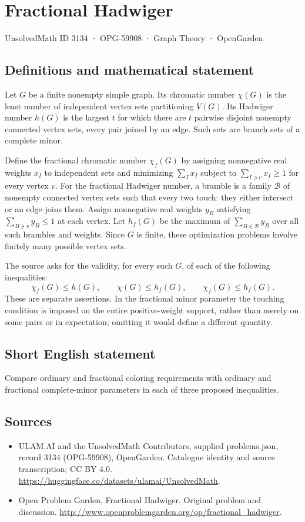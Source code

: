 \documentclass[11pt,a4paper]{article}
\begin{document}
\section*{Fractional Hadwiger}\label{3134}
{\small UnsolvedMath ID 3134 · OPG-59908 · Graph Theory · OpenGarden}
\subsection{Definitions and mathematical statement}
Let $G$ be a finite nonempty simple graph. Its chromatic number $\chi(G)$ is the least number of independent vertex sets partitioning $V(G)$. Its Hadwiger number $h(G)$ is the largest $t$ for which there are $t$ pairwise disjoint nonempty connected vertex sets, every pair joined by an edge. Such sets are branch sets of a complete minor.

Define the fractional chromatic number $\chi_f(G)$ by assigning nonnegative real weights $x_I$ to independent sets and minimizing $\sum_Ix_I$ subject to $\sum_{I\ni v}x_I\ge1$ for every vertex $v$. For the fractional Hadwiger number, a bramble is a family $\mathcal B$ of nonempty connected vertex sets such that every two touch: they either intersect or an edge joins them. Assign nonnegative real weights $y_B$ satisfying $\sum_{B\ni v}y_B\le1$ at each vertex. Let $h_f(G)$ be the maximum of $\sum_{B\in\mathcal B}y_B$ over all such brambles and weights. Since $G$ is finite, these optimization problems involve finitely many possible vertex sets.

The source asks for the validity, for every such $G$, of each of the following inequalities:
\[
 \chi_f(G)\le h(G),\qquad
 \chi(G)\le h_f(G),\qquad
 \chi_f(G)\le h_f(G).
\]
These are separate assertions. In the fractional minor parameter the touching condition is imposed on the entire positive-weight support, rather than merely on some pairs or in expectation; omitting it would define a different quantity.
\subsection{Short English statement}
Compare ordinary and fractional coloring requirements with ordinary and fractional complete-minor parameters in each of three proposed inequalities.
\subsection{Sources}
\begin{itemize}
\item[S1] ULAM.AI and the UnsolvedMath Contributors, supplied problems.json, record 3134 (OPG-59908), OpenGarden. Catalogue identity and source transcription; CC BY 4.0.
\url{https://huggingface.co/datasets/ulamai/UnsolvedMath}.
\item[S2] Open Problem Garden, Fractional Hadwiger. Original problem and discussion.
\url{http://www.openproblemgarden.org/op/fractional_hadwiger}.
\end{itemize}
\end{document}

